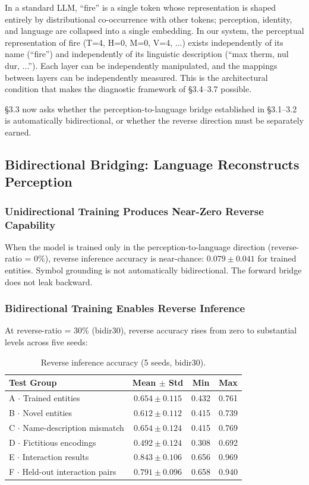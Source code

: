 \documentclass{article}
\begin{document}
In a standard LLM, ``fire'' is a single token whose representation is shaped entirely by distributional co-occurrence with other tokens; perception, identity, and language are collapsed into a single embedding. In our system, the perceptual representation of fire (T=4, H=0, M=0, V=4, ...) exists independently of its name (``fire'') and independently of its linguistic description (``max therm, nul dur, ...''). Each layer can be independently manipulated, and the mappings between layers can be independently measured. This is the architectural condition that makes the diagnostic framework of \S3.4--3.7 possible.

\S3.3 now asks whether the perception-to-language bridge established in \S3.1--3.2 is automatically bidirectional, or whether the reverse direction must be separately earned.

\subsection{Bidirectional Bridging: Language Reconstructs Perception}

\subsubsection{Unidirectional Training Produces Near-Zero Reverse Capability}

When the model is trained only in the perception-to-language direction (reverse-ratio = 0\%), reverse inference accuracy is near-chance: $0.079 \pm 0.041$ for trained entities. Symbol grounding is not automatically bidirectional. The forward bridge does not leak backward.

\subsubsection{Bidirectional Training Enables Reverse Inference}

At reverse-ratio = 30\% (bidir30), reverse accuracy rises from zero to substantial levels across five seeds:

\begin{table}[htbp]
\centering
\small
\begin{tabular}{lccc}
\toprule
Test Group & Mean $\pm$ Std & Min & Max \\
\midrule
A $\cdot$ Trained entities & $0.654 \pm 0.115$ & 0.432 & 0.761 \\
B $\cdot$ Novel entities & $0.612 \pm 0.112$ & 0.415 & 0.739 \\
C $\cdot$ Name-description mismatch & $0.654 \pm 0.124$ & 0.415 & 0.769 \\
D $\cdot$ Fictitious encodings & $0.492 \pm 0.124$ & 0.308 & 0.692 \\
E $\cdot$ Interaction results & $0.843 \pm 0.106$ & 0.656 & 0.969 \\
F $\cdot$ Held-out interaction pairs & $0.791 \pm 0.096$ & 0.658 & 0.940 \\
\bottomrule
\end{tabular}
\caption{Reverse inference accuracy (5 seeds, bidir30).}
\label{tab:reverse}
\end{table}
\end{document}
